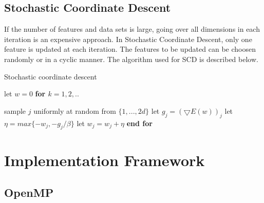 \documentclass{sigplanconf}
\newlength\myindent
\newcommand\bindent{
  \begingroup
  \setlength{\itemindent}{\myindent}
  \addtolength{\algorithmicindent}{\myindent}
}
\newcommand\eindent{\endgroup}
\begin{document}
\subsection{Stochastic Coordinate Descent}
If the number of features and data sets is large, going over all dimensions in each iteration is an
expensive approach. In Stochastic Coordinate Descent, only one feature is updated at each iteration. The 
features to be updated can be choosen randomly or in a cyclic manner. The algorithm used for SCD is 
described below.



\begin{algorithm}
\caption{Stochastic coordinate descent}
\begin{algorithmic} 
\STATE let $w = 0$
\STATE \bf{for} \begin{math} k = 1,2,.. \end{math}
    \bindent
	\STATE \textnormal{sample \begin{math}j\end{math} uniformly at random from \begin{math}\{1,...,2d\}\end{math}}
	\STATE \textnormal{let \begin{math}g_j = (\bigtriangledown{E(w)})_j\end{math}}
	\STATE \textnormal{let \begin{math}\eta = max\{ -w_j, -g_j/\beta \}\end{math}}
	\STATE \textnormal{let \begin{math}w_j = w_j + \eta\end{math}}
    \eindent
\STATE \bf{end for}
\end{algorithmic}
\end{algorithm}

\section{Implementation Framework}
\subsection{OpenMP}
\end{document}
